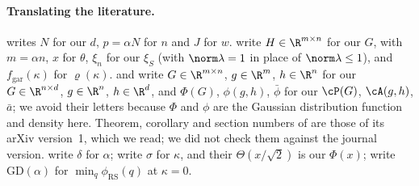 \begin{refsection}
\paragraph{Translating the literature.} \Textcite{Gardner1988} writes $N$ for our $d$, $p=\alpha N$ for $n$ and $J$ for $w$. \Textcite{Stojnic2013a,Stojnic2013b} write $H\in\R^{m\times n}$ for our $G$, with $m=\alpha n$, $x$ for $\theta$, $\xi_n$ for our $\xi_S$ (with $\norm\lambda=1$ in place of $\norm\lambda\le1$), and $f_{\mathrm{gar}}(\kappa)$ for $\varrho(\kappa)$. \Textcite{ThrampoulidisOymakHassibi2015} and \textcite{ThrampoulidisAbbasiHassibi2018} write $G\in\R^{m\times n}$, $g\in\R^m$, $h\in\R^n$ for our $G\in\R^{n\times d}$, $g\in\R^n$, $h\in\R^d$, and $\Phi(G)$, $\phi(g,h)$, $\bar\phi$ for our $\cP(G)$, $\cA(g,h)$, $\bar a$; we avoid their letters because $\Phi$ and $\phi$ are the Gaussian distribution function and density here. Theorem, corollary and section numbers of \textcite{ThrampoulidisAbbasiHassibi2018} are those of its arXiv version~1, which we read; we did not check them against the journal version. \Textcite{MontanariZhongZhou2024} write $\delta$ for $\alpha$; \textcite{FranzEtAl2017} write $\sigma$ for $\kappa$, and their $\Theta(x/\sqrt2)$ is our $\Phi(x)$; \textcite{AltschulerTikhomirov2024} write $\mathrm{GD}(\alpha)$ for $\min_q\phi_{\mathrm{RS}}(q)$ at $\kappa=0$.

\printchapterbib
\end{refsection}
